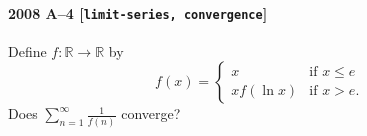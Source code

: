 \paragraph{2008 A--4 \textnormal{[\texttt{limit-series, convergence}]}}
Define $f: \mathbb{R} \to \mathbb{R}$ by
\[
f(x) = \begin{cases} x & \mbox{if $x \leq e$} \\ x f(\ln x) &
\mbox{if $x > e$.} \end{cases}
\]
Does $\sum_{n=1}^\infty \frac{1}{f(n)}$ converge?
